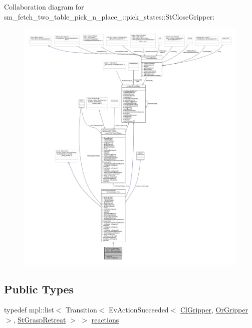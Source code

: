Collaboration diagram for sm\+\_\+fetch\+\_\+two\+\_\+table\+\_\+pick\+\_\+n\+\_\+place\+\_\+:\+:pick\+\_\+states\+:\+:St\+Close\+Gripper\+:
\nopagebreak
\begin{figure}[H]
\begin{center}
\leavevmode
\includegraphics[width=350pt]{structsm__fetch__two__table__pick__n__place__1_1_1pick__states_1_1StCloseGripper__coll__graph}
\end{center}
\end{figure}
\subsection*{Public Types}
\begin{DoxyCompactItemize}
\item 
typedef mpl\+::list$<$ Transition$<$ Ev\+Action\+Succeeded$<$ \hyperlink{classsm__fetch__two__table__pick__n__place__1_1_1cl__gripper_1_1ClGripper}{Cl\+Gripper}, \hyperlink{classsm__fetch__two__table__pick__n__place__1_1_1OrGripper}{Or\+Gripper} $>$, \hyperlink{structsm__fetch__two__table__pick__n__place__1_1_1pick__states_1_1StGraspRetreat}{St\+Grasp\+Retreat} $>$ $>$ \hyperlink{structsm__fetch__two__table__pick__n__place__1_1_1pick__states_1_1StCloseGripper_a767854cf0c9c0e8489cbae35c8e21b9f}{reactions}
\end{DoxyCompactItemize}
